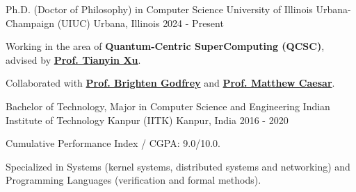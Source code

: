 

  \cventry
    {Ph.D. (Doctor of Philosophy) in Computer Science}
    {University of Illinois Urbana-Champaign (UIUC)}
    {Urbana, Illinois}
    {2024 - Present}
    {
      \begin{cvitems}
        \item Working in the area of \textbf{Quantum-Centric SuperComputing (QCSC)}, advised by \href{https://tianyin.github.io/}{\textbf{Prof. Tianyin Xu}}.
        \item Collaborated with \href{https://pbg.cs.illinois.edu/}{\textbf{Prof. Brighten Godfrey}} and \href{https://caesar.cs.illinois.edu/}{\textbf{Prof. Matthew Caesar}}.
      \end{cvitems}
    }

  \cventry
    {Bachelor of Technology, Major in Computer Science and Engineering}
    {Indian Institute of Technology Kanpur (IITK)}
    {Kanpur, India}
    {2016 - 2020}
    {
      \begin{cvitems}
        \item Cumulative Performance Index / CGPA: 9.0/10.0.
        \item Specialized in Systems (kernel systems, distributed systems and networking) and Programming Languages (verification and formal methods).
      \end{cvitems}
    }

